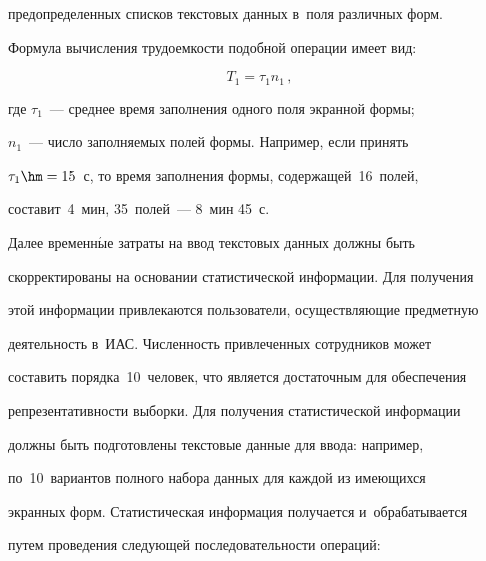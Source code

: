 предопределенных списков текстовых данных в~поля различных форм.


      


      Формула вычисления трудоемкости подобной операции имеет вид:


      \begin{equation}


      T_1=\tau_1 n_1\,,


      \label{e1-bor}


      \end{equation}


где $\tau_1$~--- среднее время заполнения одного поля экранной формы; 


$n_1$~--- число заполняемых полей формы. Например, если принять 


$\tau_1\hm=15$~с, то время заполнения формы, содержащей~16~полей, 


составит~4~мин, 35~полей~--- 8~мин 45~с.


      


      Далее временн$\acute{\mbox{ы}}$е затраты на ввод текстовых данных должны быть 


скорректированы на основании статистической информации. Для получения 


этой информации привлекаются пользователи, осуществляющие предметную 


деятельность в~ИАС. Численность привлеченных сотрудников может 


составить порядка~10~человек, что является достаточным для обеспечения 


репрезентативности выборки. Для получения статистической информации 


должны быть подготовлены текстовые данные для ввода: например, 


по~10~вариантов полного набора данных для каждой из имеющихся 


экранных форм. Статистическая информация получается и~обрабатывается 


путем проведения следующей последовательности операций:


